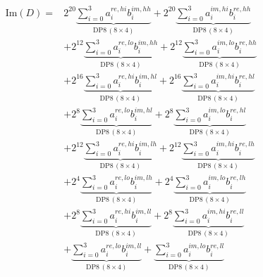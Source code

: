 \documentclass[fleqn]{article}
\newcommand{\DPop}[3]{\mathrm{DP#1}\,(#2\!\times\!#3)}
\begin{document}
\begin{align*}
\mathrm{Im}(D) = {}
  & 2^{20}\underbrace{\sum_{i=0}^{3} a_i^{re,hi} b_i^{im,hh}}_{\DPop{8}{8}{4}} + 2^{20}\underbrace{\sum_{i=0}^{3} a_i^{im,hi} b_i^{re,hh}}_{\DPop{8}{8}{4}} \\[0.5em]
  & + 2^{12}\underbrace{\sum_{i=0}^{3} a_i^{re,lo} b_i^{im,hh}}_{\DPop{8}{8}{4}} + 2^{12}\underbrace{\sum_{i=0}^{3} a_i^{im,lo} b_i^{re,hh}}_{\DPop{8}{8}{4}} \\[0.5em]
  & + 2^{16}\underbrace{\sum_{i=0}^{3} a_i^{re,hi} b_i^{im,hl}}_{\DPop{8}{8}{4}} + 2^{16}\underbrace{\sum_{i=0}^{3} a_i^{im,hi} b_i^{re,hl}}_{\DPop{8}{8}{4}} \\[0.5em]
  & + 2^{8}\underbrace{\sum_{i=0}^{3} a_i^{re,lo} b_i^{im,hl}}_{\DPop{8}{8}{4}} + 2^{8}\underbrace{\sum_{i=0}^{3} a_i^{im,lo} b_i^{re,hl}}_{\DPop{8}{8}{4}} \\[0.5em]
  & + 2^{12}\underbrace{\sum_{i=0}^{3} a_i^{re,hi} b_i^{im,lh}}_{\DPop{8}{8}{4}} + 2^{12}\underbrace{\sum_{i=0}^{3} a_i^{im,hi} b_i^{re,lh}}_{\DPop{8}{8}{4}} \\[0.5em]
  & + 2^{4}\underbrace{\sum_{i=0}^{3} a_i^{re,lo} b_i^{im,lh}}_{\DPop{8}{8}{4}} + 2^{4}\underbrace{\sum_{i=0}^{3} a_i^{im,lo} b_i^{re,lh}}_{\DPop{8}{8}{4}} \\[0.5em]
  & + 2^{8}\underbrace{\sum_{i=0}^{3} a_i^{re,hi} b_i^{im,ll}}_{\DPop{8}{8}{4}} + 2^{8}\underbrace{\sum_{i=0}^{3} a_i^{im,hi} b_i^{re,ll}}_{\DPop{8}{8}{4}} \\[0.5em]
  & + \underbrace{\sum_{i=0}^{3} a_i^{re,lo} b_i^{im,ll}}_{\DPop{8}{8}{4}} + \underbrace{\sum_{i=0}^{3} a_i^{im,lo} b_i^{re,ll}}_{\DPop{8}{8}{4}}
\end{align*}
\end{document}
